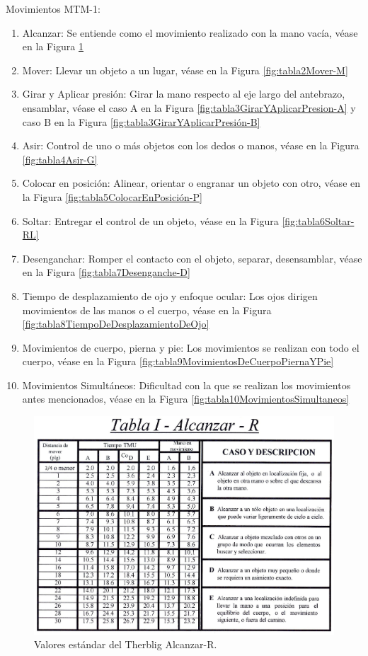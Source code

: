     Movimientos MTM-1:
    \begin{enumerate}
        \item Alcanzar: Se entiende como el movimiento realizado con la mano vacía, véase en la Figura \ref{fig:tabla1Alcanzar-R }
        \item Mover: Llevar un objeto a un lugar, véase en la Figura \ref{fig:tabla2Mover-M}
        \item Girar y Aplicar presión: Girar la mano respecto al eje largo del antebrazo, ensamblar, véase el caso A en la Figura \ref{fig:tabla3GirarYAplicarPresion-A} y caso B en la Figura \ref{fig:tabla3GirarYAplicarPresión-B}
        \item Asir: Control de uno o más objetos con los dedos o manos, véase en la Figura \ref{fig:tabla4Asir-G}
        \item Colocar en posición: Alinear, orientar o engranar un objeto con otro, véase en la Figura \ref{fig:tabla5ColocarEnPosición-P}
        \item Soltar: Entregar el control de un objeto, véase en la Figura \ref{fig:tabla6Soltar-RL}
        \item Desenganchar: Romper el contacto con el objeto, separar, desensamblar, véase en la Figura \ref{fig:tabla7Desenganche-D}
        \item Tiempo de desplazamiento de ojo y enfoque ocular: Los ojos dirigen movimientos de las manos o el cuerpo, véase en la Figura \ref{fig:tabla8TiempoDeDesplazamientoDeOjo}
        \item Movimientos de cuerpo, pierna y pie: Los movimientos se realizan con todo el cuerpo, véase en la Figura \ref{fig:tabla9MovimientosDeCuerpoPiernaYPie} 
        \item Movimientos Simultáneos: Dificultad con la que se realizan los movimientos antes mencionados, véase en la Figura \ref{fig:tabla10MovimientosSimultaneos}
    \end{enumerate}
    \begin{figure}[H]
        \centering
        \includegraphics[scale=0.32]{3/Img/tabla1Alcanzar-R .pdf}
        \caption{Valores estándar del Therblig Alcanzar-R.}
        \label{fig:tabla1Alcanzar-R }
    \end{figure}
